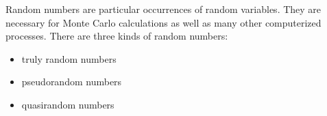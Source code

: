 \documentclass{article}
\begin{document}
Random numbers are particular occurrences of random variables. They are necessary for Monte Carlo calculations as well as many other computerized processes.  There are three kinds of random numbers:

\begin{itemize}
\item truly random numbers
\item pseudorandom numbers
\item quasirandom numbers
\end{itemize}
\end{document}
